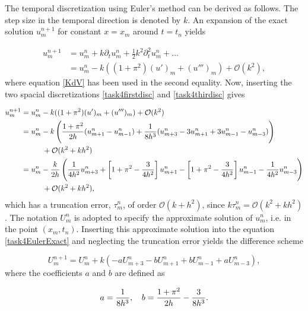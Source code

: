 The temporal discretization using Euler's method can be derived as follows. The step size in the temporal direction is denoted by $k$. An expansion of the exact solution $u_m^{n+1}$ for constant $x = x_m$ around $t = t_n$ yields 

\begin{equation*}
\begin{split}
    u_m^{n+1} &= u_m^n + k \partial_tu_m^n + \frac12k^2\partial^2_tu_m^n + \dots \\ 
    &= u_m^n - k((1+\pi^2)(u')_m + (u''')_m) + \mathcal{O}(k^2), 
\end{split}
\end{equation*}
where equation \eqref{KdV} has been used in the second equality. Now, inserting the two spacial discretizations \eqref{task4firstdisc} and \eqref{task4thirdisc} gives

\begin{equation}
\begin{split}
\label{task4EulerExact}
    u_m^{n+1} &= u_m^n - k((1+\pi^2)(u')_m + (u''')_m) + \mathcal{O}(k^2)\\ 
    &= u_m^n - k\left(\frac{1+\pi^2}{2h}(u_{m+1}^n - u_{m-1}^n) + \frac{1}{8h^3}(u_{m+3}^n - 3u_{m+1}^n + 3u_{m-1}^n - u_{m-3}^n)\right) \\& \hspace{10mm} + \mathcal{O}(k^2 + kh^2)\\
    &= u_m^n - \frac{k}{2h}\left(\frac{1}{4h^2}u_{m+3}^n+\left[1+\pi^2 - \frac{3}{4h^2}\right]u_{m+1}^n-\left[1+\pi^2 - \frac{3}{4h^2}\right]u_{m-1}^n-\frac{1}{4h^2}u_{m-3}^n\right) \\& \hspace{10mm} + \mathcal{O}(k^2 + k h^2),
\end{split}
\end{equation}
which has a truncation error, $\tau_m^n$, of order $\mathcal{O}(k + h^2)$, since $k\tau_m^n = \mathcal{O}(k^2 + kh^2)$. The notation $U_m^n$ is adopted to specify the approximate solution of $u_m^n$, i.e. in the point $(x_m, t_n)$. Inserting this approximate solution into the equation \eqref{task4EulerExact} and neglecting the truncation error yields the difference scheme 

\begin{equation}
\label{task4discEuler}
    U_m^{n+1} = U_m^n + k\left(-aU_{m+3}^n-b U_{m+1}^n+bU_{m-1}^n+aU_{m-3}^n\right),
\end{equation}
where the coefficients $a$ and $b$ are defined as

\begin{equation}
\label{constants_spatialdiscretization}
    a = \frac{1}{8h^3} \text{,} \hspace{4mm}
    b = \frac{1+\pi^2}{2h} - \frac{3}{8h^3}.
\end{equation}
\newline

